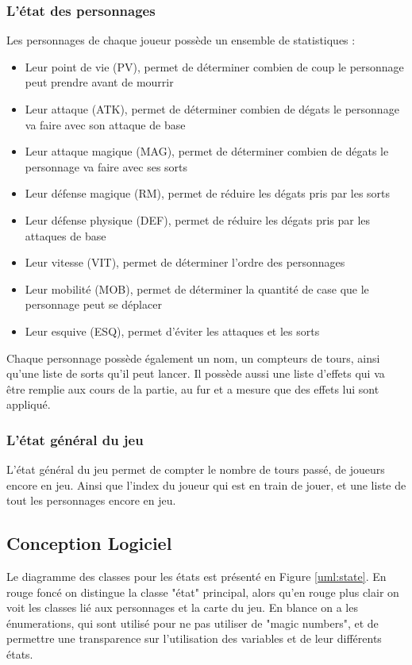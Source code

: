 \documentclass[a4paper,12pt]{article}
\begin{document}
\subsubsection{L'état des personnages}

Les personnages de chaque joueur possède un ensemble de statistiques :
\begin{itemize}
  \item Leur point de vie (PV), permet de déterminer combien de coup le personnage peut prendre avant de mourrir
  \item Leur attaque (ATK), permet de déterminer combien de dégats le personnage va faire avec son attaque de base
  \item Leur attaque magique (MAG), permet de déterminer combien de dégats le personnage va faire avec ses sorts
  \item Leur défense magique (RM), permet de réduire les dégats pris par les sorts
  \item Leur défense physique (DEF), permet de réduire les dégats pris par les attaques de base
  \item Leur vitesse (VIT), permet de déterminer l'ordre des personnages
  \item Leur mobilité (MOB), permet de déterminer la quantité de case que le personnage peut se déplacer
  \item Leur esquive (ESQ), permet d'éviter les attaques et les sorts
\end{itemize}

Chaque personnage possède également un nom, un compteurs de tours, ainsi qu'une liste
de sorts qu'il peut lancer. Il possède aussi une liste d'effets qui va être remplie aux cours de la partie,
au fur et a mesure que des effets lui sont appliqué.

\subsubsection{L'état général du jeu}

L'état général du jeu permet de compter le nombre de tours passé, de joueurs encore en jeu.
Ainsi que l'index du joueur qui est en train de jouer, et une liste de tout les personnages encore en jeu.

\subsection{Conception Logiciel}

Le diagramme des classes pour les états est présenté en Figure \ref{uml:state}. En rouge foncé
on distingue la classe "état" principal, alors qu'en rouge plus clair on voit les classes lié aux personnages 
et la carte du jeu. En blance on a les énumerations, qui sont utilisé pour ne pas utiliser de "magic numbers", 
et de permettre une transparence sur l'utilisation des variables et de leur différents états.
\end{document}
